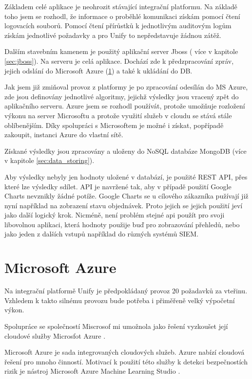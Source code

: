 \documentclass[thesis=M,czech]{FITthesis}[2012/10/20]
\begin{document}
	Základem celé aplikace je neohrozit stávající integrační platformu. Na základě toho jsem se rozhodl, že informace o proběhlé komunikaci získám pomocí čtení logovacích souborů.
	Pomocí čtení přírůstků k jednotlivým auditovým logům získám jednotlivé požadavky a pro Unify to nepředstavuje žádnou zátěž.
	
	Dalším stavebním kamenem je použitý aplikační server Jboss ( více v kapitole \ref{sec:jboss}). Na serveru je celá aplikace. Dochází zde k předzpracování zpráv, jejich odslání do Microsoft Azure (\ref{sec:ms_azure}) a také k ukládání do DB.
	
	Jak jsem již zmiňoval provoz z platformy je po zpracování odesílán do MS Azure, zde jsou definovány jednotlivé algoritmy, jejichž výsledky jsou vracený zpět do aplikačního serveru. Azure jsem se rozhodl používát, protože umožňuje rozložení výkonu na server Microsoftu a protože využití služeb v cloudu se stává stále oblíbenějším. Díky spolupráci s Microsoftem je možné i získat, popřípadě zakoupit, instanci Azure do vlastní sítě.
	
	Získané výsledky jsou zpracovány a uloženy do NoSQL databáze MongoDB (více v kapitole \ref{sec:data_storing}).
	
	Aby výsledky nebyly jen hodnoty uložené v databází, je použité REST API, přes které lze výsledky sdílet. API je navržené tak, aby v případě použití Google Charts nevznikly žádné potíže. Google Charts se u cílového zákazníka pužívají již nyní například na zobrazení stavu objednávek. Proto jejich se jejich použití jeví jako další logický krok. Nicméně, není problém stejné api použít pro svoji libovolnou aplikaci, která hodnoty použije buď pro zobrazování přehledů, nebo jako jeden z dalších vstupů například do různých systémů SIEM.
	
	\section{Microsoft Azure}
		\label{sec:ms_azure}
		Na integrační platformě Unify \cite{unify} je předpokládaný provoz 20 požadavků za vteřinu. Vzhledem k takto silnému provozu bude potřeba i přiměřeně velký výpočetní výkon. 
			
		Spolupráce se společností Miscrosof \cite{microsoft} mi umožnola jako řešení vyzkoušet její cloudové služby Microsfot Azure \cite{msAzure}.
			
		Microsoft Azure je sada integrovaných cloudových služeb. Azure nabízí cloudová řešení pro mnoho činností. Motivací k použití této služby k detekci bezpečnostích rizik je nástroj Microsoft Azure Machine Learning Studio \cite{msAzureStudio}.
			
\end{document}
